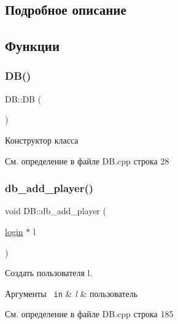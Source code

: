\subsection{Подробное описание}


\subsection{Функции}
\mbox{\label{group__dbcpp_ga29a603c52c10831cddee82518417f992}} 
\subsubsection{\texorpdfstring{DB()}{DB()}}
{\footnotesize\ttfamily D\+B\+::\+DB (\begin{DoxyParamCaption}{ }\end{DoxyParamCaption})}



Конструктор класса 



См. определение в файле D\+B.\+cpp строка 28

\mbox{\label{group__dbcpp_ga472c425f9a22c467e4acd0e800153837}} 
\subsubsection{\texorpdfstring{db\_add\_player()}{db\_add\_player()}}
{\footnotesize\ttfamily void D\+B\+::db\+\_\+add\+\_\+player (\begin{DoxyParamCaption}\item[{\mbox{\hyperlink{structlogin}{login}} $\ast$}]{l }\end{DoxyParamCaption})}



Создать пользователя l. 


\begin{DoxyParams}[1]{Аргументы}
\mbox{\texttt{ in}}  & {\em l} & пользователь \\
\hline
\end{DoxyParams}


См. определение в файле D\+B.\+cpp строка 185

\mbox{\label{group__dbcpp_gaea6044c3fffc4c31714c732bb3789f71}} 
